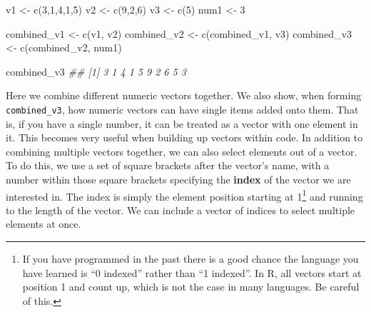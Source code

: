 \documentclass[
  letterpaper,
  DIV=11,
  numbers=noendperiod]{scrreprt}
\newenvironment{Shaded}{\begin{snugshade}}{\end{snugshade}}
\newcommand{\DecValTok}[1]{\textcolor[rgb]{0.68,0.00,0.00}{#1}}
\newcommand{\DocumentationTok}[1]{\textcolor[rgb]{0.37,0.37,0.37}{\textit{#1}}}
\newcommand{\FunctionTok}[1]{\textcolor[rgb]{0.28,0.35,0.67}{#1}}
\newcommand{\NormalTok}[1]{\textcolor[rgb]{0.00,0.23,0.31}{#1}}
\newcommand{\OtherTok}[1]{\textcolor[rgb]{0.00,0.23,0.31}{#1}}
\theoremstyle{definition}
\theoremstyle{definition}
\theoremstyle{definition}
\theoremstyle{remark}
\begin{document}
\begin{Shaded}
\begin{Highlighting}[]
\NormalTok{v1 }\OtherTok{\textless{}{-}} \FunctionTok{c}\NormalTok{(}\DecValTok{3}\NormalTok{,}\DecValTok{1}\NormalTok{,}\DecValTok{4}\NormalTok{,}\DecValTok{1}\NormalTok{,}\DecValTok{5}\NormalTok{)}
\NormalTok{v2 }\OtherTok{\textless{}{-}} \FunctionTok{c}\NormalTok{(}\DecValTok{9}\NormalTok{,}\DecValTok{2}\NormalTok{,}\DecValTok{6}\NormalTok{)}
\NormalTok{v3 }\OtherTok{\textless{}{-}} \FunctionTok{c}\NormalTok{(}\DecValTok{5}\NormalTok{)}
\NormalTok{num1 }\OtherTok{\textless{}{-}} \DecValTok{3}

\NormalTok{combined\_v1 }\OtherTok{\textless{}{-}} \FunctionTok{c}\NormalTok{(v1, v2)}
\NormalTok{combined\_v2 }\OtherTok{\textless{}{-}} \FunctionTok{c}\NormalTok{(combined\_v1, v3)}
\NormalTok{combined\_v3 }\OtherTok{\textless{}{-}} \FunctionTok{c}\NormalTok{(combined\_v2, num1)}

\NormalTok{combined\_v3}
\DocumentationTok{\#\#  [1] 3 1 4 1 5 9 2 6 5 3}
\end{Highlighting}
\end{Shaded}

Here we combine different numeric vectors together. We also show, when
forming \texttt{combined\_v3}, how numeric vectors can have single items
added onto them. That is, if you have a single number, it can be treated
as a vector with one element in it. This becomes very useful when
building up vectors within code. In addition to combining multiple
vectors together, we can also select elements out of a vector. To do
this, we use a set of square brackets after the vector's name, with a
number within those square brackets specifying the \textbf{index} of the
vector we are interested in. The index is simply the element position
starting at 1\footnote{If you have programmed in the past there is a
  good chance the language you have learned is ``0 indexed'' rather than
  ``1 indexed''. In R, all vectors start at position 1 and count up,
  which is not the case in many languages. Be careful of this.} and
running to the length of the vector. We can include a vector of indices
to select multiple elements at once.
\end{document}
